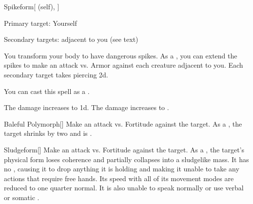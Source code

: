 \lowercase{\hypertarget{spell:Spikeform}{}}\label{spell:Spikeform}
\begin{attuneability}[Rank 4]{\hypertarget{spell:Spikeform}{Spikeform}}[ (self), ]

Primary target: Yourself
\par\noindent
Secondary targets:  adjacent to you (see text)

You transform your body to have dangerous spikes.
As a , you can extend the spikes to make an attack vs. Armor against each creature adjacent to you.
\hit Each secondary target takes piercing  \minus2d.

You can cast this spell as a .

\rankline
{} The damage increases to  \minus1d.
 The damage increases to .
\end{attuneability}
\vspace{0.25em}



\lowercase{\hypertarget{spell:Baleful Polymorph}{}}\label{spell:Baleful Polymorph}
\begin{freeability}[Rank 7]{\hypertarget{spell:Baleful Polymorph}{Baleful Polymorph}}[]
Make an attack vs. Fortitude against the target.
\hit As a , the target shrinks by two  and is .
\end{freeability}
\vspace{0.25em}



\lowercase{\hypertarget{spell:Sludgeform}{}}\label{spell:Sludgeform}
\begin{freeability}[Rank 8]{\hypertarget{spell:Sludgeform}{Sludgeform}}[]
Make an attack vs. Fortitude against the target.
\hit As a , the target's physical form loses coherence and partially collapses into a sludgelike mass.
It has no , causing it to drop anything it is holding and making it unable to take any actions that require free hands.
Its speed with all of its  movement modes are reduced to one quarter normal.
It is also unable to speak normally or use verbal or somatic .
\end{freeability}
\vspace{0.25em}



